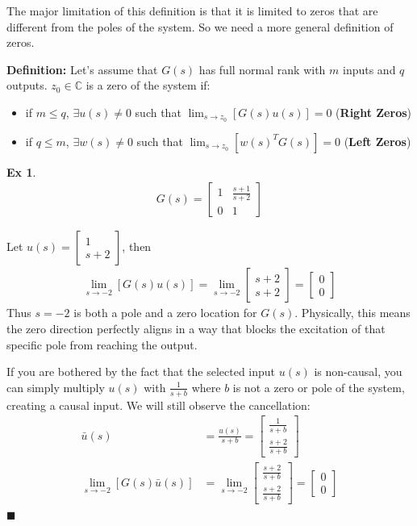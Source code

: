 \documentclass[twoside]{article}
\newtheorem{exmp}[theorem]{Ex}
\begin{document}
\vspace{12pt}

The major limitation of this definition is that it is limited to zeros that are different from the poles of the system. So we 
need a more general definition of zeros.

\vspace{12pt}

\textbf{Definition:} Let's assume that $G(s)$ has full normal rank with $m$ inputs and $q$ outputs. $z_0 \in \mathbb{C}$ is a zero of the system if:
\begin{itemize}
\item if $m \leq q$, $\exists u(s) \neq 0$  such that $\lim_{s \to z_0} [ G(s) u(s) ] = 0$ (\textbf{Right Zeros})
\item if $q \leq m$, $\exists w(s) \neq 0$ such that $\lim_{s \to z_0} [ w(s)^T G(s) ] = 0$ (\textbf{Left Zeros})
\end{itemize}
%
\begin{exmp}
	\begin{align*}
	G(s) = \begin{bmatrix} 1 & \frac{s+1}{s+2}  \\  
	0 & 1  \end{bmatrix}
	\end{align*}
\end{exmp}

Let $u(s) = \begin{bmatrix} 1 \\ s+2 \end{bmatrix}$, then
%
\begin{align*}
\lim_{s \to -2} [ G(s) u(s) ] = \lim_{s \to -2} \begin{bmatrix} s+2 \\ s+2 \end{bmatrix} = \begin{bmatrix} 0 \\ 0 \end{bmatrix}
\end{align*}
%
Thus $s = -2$ is both a pole and a zero location for $G(s)$. Physically, this means the zero direction perfectly aligns in a way that blocks the excitation of that specific pole from reaching the output. 

If you are bothered by the fact that the selected input $u(s)$ is non-causal, you can simply multiply $u(s)$ with $\frac{1}{s+b}$ where $b$ is not a zero or pole of the system, creating a causal input. We will still observe the cancellation:
%
\begin{align*}
\bar{u}(s) &= \frac{u(s)}{s+b} = \begin{bmatrix} \frac{1}{s+b} \\ \frac{s+2}{s+b} \end{bmatrix}
\\
\lim_{s \to -2} [ G(s) \bar{u}(s) ] &= \lim_{s \to -2} \begin{bmatrix} \frac{s+2}{s+b} \\ \frac{s+2}{s+b} \end{bmatrix} = \begin{bmatrix} 0 \\ 0 \end{bmatrix}
\end{align*}
\hfill $\blacksquare$
\end{document}
